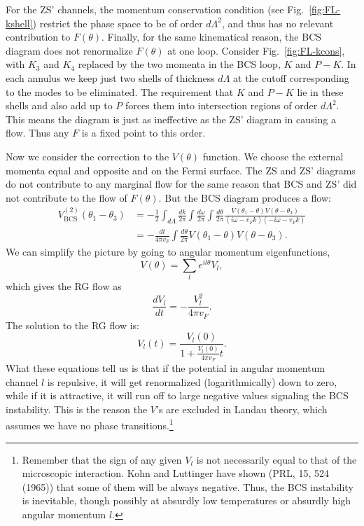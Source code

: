 For the ZS' channels, the momentum conservation condition (see Fig.~\ref{fig:FL-kshell}) restrict the phase space to be of order $d\Lambda^2$, and thus has no relevant contribution to $F(\theta)$.
Finally, for the same kinematical reason, the BCS diagram does not renormalize $F(\theta)$ at one loop.
Consider Fig.~\ref{fig:FL-kcons}, with $K_3$ and $K_4$ replaced by the two momenta in the BCS loop, $K$ and $P-K$.
In each annulus we keep just two shells of thickness $d\Lambda$ at the cutoff corresponding to the modes to be eliminated. 
The requirement that $K$ and $P-K$ lie in these shells and also add up to $P$ forces them into intersection regions of order $d\Lambda^2$. 
This means the diagram is just as ineffective as the ZS' diagram in causing a flow. 
Thus any $F$ is a fixed point to this order.

Now we consider the correction to the $V(\theta)$ function.
We choose the external momenta equal and opposite and on the Fermi surface. 
The ZS and ZS' diagrams do not contribute to any marginal flow for the same reason that BCS and ZS' did not contribute to the flow of $F(\theta)$.
But the BCS diagram produces a flow:
\begin{equation}
\begin{aligned}
	V^{(2)}_{\mathrm{BCS}}(\theta_1-\theta_3) 
	&= -\frac{1}{2}\int_{d\Lambda}\frac{dk}{2\pi}\int\frac{d\omega}{2\pi}\int\frac{d\theta}{2\pi} 
		\frac{V(\theta_1-\theta)V(\theta-\theta_3)}{(i\omega-v_F k)(-i\omega-v_F k)} \\
	&= -\frac{dt}{4\pi v_F}\int \frac{d\theta}{2\pi}V(\theta_1-\theta)V(\theta-\theta_3).
\end{aligned}
\end{equation} 
We can simplify the picture by going to angular momentum eigenfunctions,
\begin{equation}
	V(\theta) = \sum_l e^{il\theta} V_l,
\end{equation}
which gives the RG flow as
\begin{equation}
	\frac{dV_l}{dt} = -\frac{V_l^2}{4\pi v_F}.
\end{equation}
The solution to the RG flow is:
\begin{equation}
	V_l(t) = \frac{V_l(0)}{1+\frac{V_l(0)}{4\pi v_F}t}.
\end{equation}
What these equations tell us is that if the potential in angular momentum channel $l$ is repulsive, it will get renormalized (logarithmically) down to zero, while if it is attractive, it will run off to large negative values signaling the BCS instability. 
This is the reason the $V$'s are excluded in Landau theory, which assumes we have no phase transitions.\footnote{Remember that the sign of any given $V_l$ is not necessarily equal to that of the microscopic interaction. Kohn and Luttinger have shown (PRL, 15, 524 (1965)) that some of them will be always negative. Thus, the BCS instability is inevitable, though possibly at absurdly low temperatures or absurdly high angular momentum $l$.}



